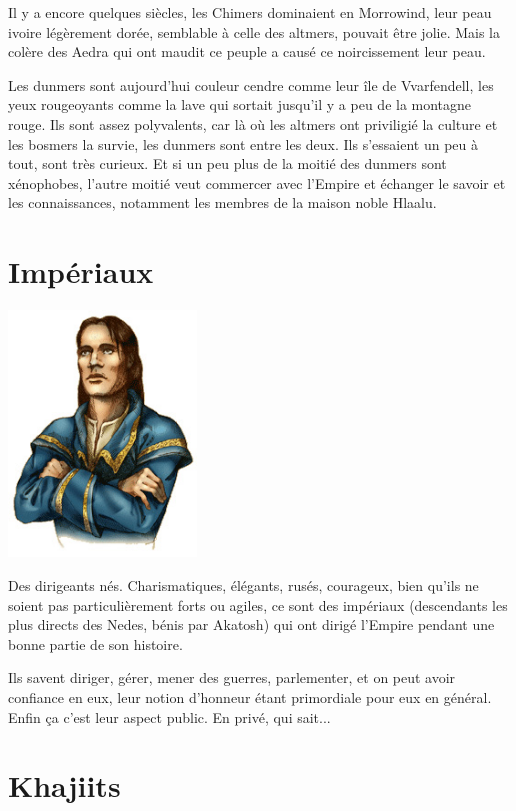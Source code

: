   Il y a encore quelques siècles, les Chimers dominaient en Morrowind, leur peau ivoire légèrement dorée, semblable à celle des altmers, pouvait être jolie. Mais la colère des Aedra qui ont maudit ce peuple a causé ce noircissement leur peau.
  
  Les dunmers sont aujourd'hui couleur cendre comme leur île de Vvarfendell, les yeux rougeoyants comme la lave qui sortait jusqu'il y a peu de la montagne rouge. Ils sont assez polyvalents, car là où les altmers ont priviligié la culture et les bosmers la survie, les dunmers sont entre les deux. Ils s'essaient un peu à tout, sont très curieux. Et si un peu plus de la moitié des dunmers sont xénophobes, l'autre moitié veut commercer avec l'Empire et échanger le savoir et les connaissances, notamment les membres de la maison noble Hlaalu.

  \section{Impériaux}
  
  \begin{center}
  \includegraphics[width=5cm]{images/race_imperial.jpg}
  \end{center}
  
  Des dirigeants nés. Charismatiques, élégants, rusés, courageux, bien qu'ils ne soient pas particulièrement forts ou agiles, ce sont des impériaux (descendants les plus directs des Nedes, bénis par Akatosh) qui ont dirigé l'Empire pendant une bonne partie de son histoire.
  
  Ils savent diriger, gérer, mener des guerres, parlementer, et on peut avoir confiance en eux, leur notion d'honneur étant primordiale pour eux en général. Enfin ça c'est leur aspect public. En privé, qui sait...

  \section{Khajiits}
  
